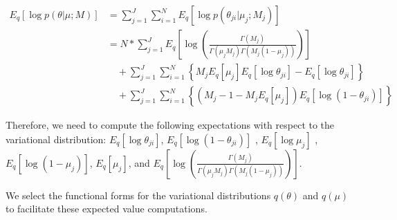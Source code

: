 \documentclass{bmcart}
\begin{document}
\begin{equation}
\begin{split}
\label{theta}
E_q \left[ \log p\left(\theta | \mu; M \right)\right] &= \sum_{j=1}^{J} \sum_{i=1}^{N} E_q \left[ \log p\left(\theta_{ji} | \mu_j; M_j \right)\right] \\
&= N* \sum_{j=1}^{J} E_q  \left[ \log \left( \frac{ \Gamma(M_j) } { \Gamma(\mu_j M_j) \Gamma(M_j (1-\mu_j)) }\right) \right] \\
&\quad + \sum_{j=1}^{J} \sum_{i=1}^{N} \left\lbrace M_j E_q \left[ \mu_j \right] E_q \left[ \log \theta_{ji} \right] - E_q  \left[ \log \theta_{ji} \right] \right\rbrace\\
&\quad + \sum_{j=1}^{J} \sum_{i=1}^{N} \left\lbrace \left( M_j - 1 - M_j E_q\left[ \mu_j \right]  \right) E_q\left[ \log \left( 1 - \theta_{ji}\right) \right] \right\rbrace
\end{split}
\end{equation}

Therefore, we need to compute the following expectations with respect to the variational distribution:
%
$ E_q \left[ \log \theta_{ji} \right] $, $ E_q\left[ \log \left( 1 - \theta_{ji}\right) \right] $ , $ E_q  \left[ \log \mu_j \right] $ , $ E_q  \left[ \log (1 - \mu_j)\right] $, $ E_q \left[ \mu_j \right] $, and $ E_q\left[ \log \left( \frac{ \Gamma(M_j) } { \Gamma(\mu_j M_j) \Gamma(M_j (1-\mu_j)) }\right)\right] $.

We select the functional forms for the variational distributions $q(\theta)$ and $q(\mu)$ to facilitate these expected value computations.
\end{document}
